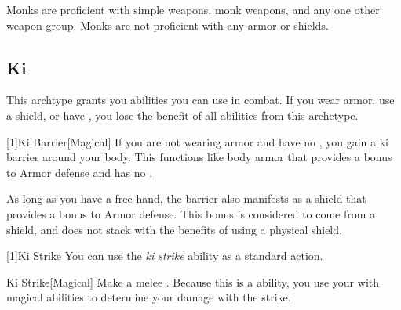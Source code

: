         Monks are proficient with simple weapons, monk weapons, and any one other weapon group.
        Monks are not proficient with any armor or shields.

    \subsection{Ki}
        This archtype grants you abilities you can use in combat.
        If you wear armor, use a shield, or have , you lose the benefit of all abilities from this archetype.

        [1]{Ki Barrier}[Magical]
        If you are not wearing armor and have no , you gain a ki barrier around your body.
        This functions like body armor that provides a  bonus to Armor defense and has no .

        As long as you have a free hand, the barrier also manifests as a shield that provides a  bonus to Armor defense.
        This bonus is considered to come from a shield, and does not stack with the benefits of using a physical shield.

        [1]{Ki Strike} You can use the \textit{ki strike} ability as a standard action.
        \begin{freeability}{Ki Strike}[Magical]
            Make a melee .
            Because this is a  ability, you use your  with magical abilities to determine your damage with the strike.
        \end{freeability}

